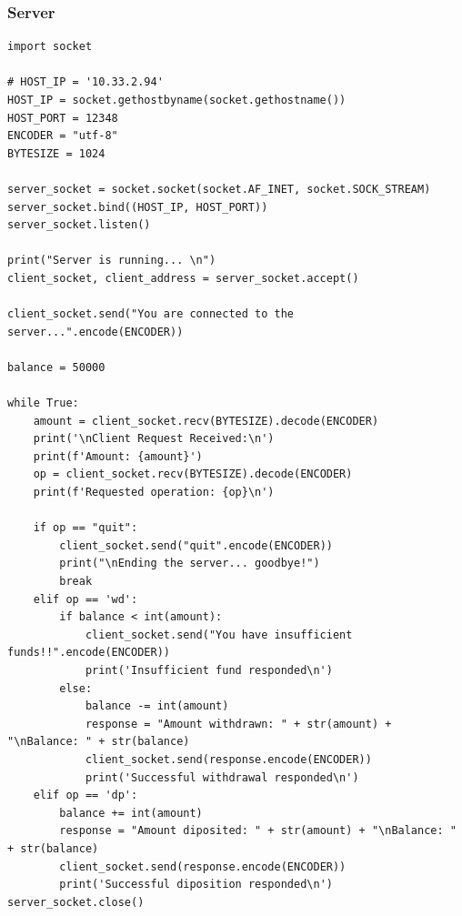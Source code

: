 \documentclass[11pt]{article}
\begin{document}
\subsubsection*{Server}
\begin{verbatim}
import socket

# HOST_IP = '10.33.2.94'
HOST_IP = socket.gethostbyname(socket.gethostname())
HOST_PORT = 12348
ENCODER = "utf-8"
BYTESIZE = 1024

server_socket = socket.socket(socket.AF_INET, socket.SOCK_STREAM)
server_socket.bind((HOST_IP, HOST_PORT))
server_socket.listen()

print("Server is running... \n")
client_socket, client_address = server_socket.accept()

client_socket.send("You are connected to the server...".encode(ENCODER))

balance = 50000

while True:
    amount = client_socket.recv(BYTESIZE).decode(ENCODER)
    print('\nClient Request Received:\n')
    print(f'Amount: {amount}')
    op = client_socket.recv(BYTESIZE).decode(ENCODER)
    print(f'Requested operation: {op}\n')

    if op == "quit":
        client_socket.send("quit".encode(ENCODER))
        print("\nEnding the server... goodbye!")
        break
    elif op == 'wd':
        if balance < int(amount):
            client_socket.send("You have insufficient funds!!".encode(ENCODER))
            print('Insufficient fund responded\n')
        else:
            balance -= int(amount)
            response = "Amount withdrawn: " + str(amount) + "\nBalance: " + str(balance)
            client_socket.send(response.encode(ENCODER))
            print('Successful withdrawal responded\n')
    elif op == 'dp':
        balance += int(amount)
        response = "Amount diposited: " + str(amount) + "\nBalance: " + str(balance)
        client_socket.send(response.encode(ENCODER))
        print('Successful diposition responded\n')
server_socket.close()
\end{verbatim}
\end{document}
